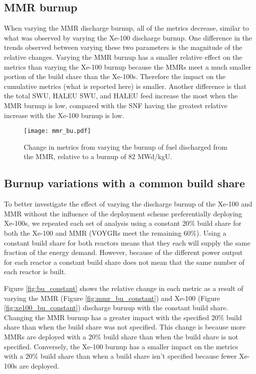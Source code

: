 \subsection{MMR burnup}
When varying the \gls{MMR} discharge burnup, all of the metrics decrease, similar 
to what was observed by varying the Xe-100 discharge burnup. One difference in 
the trends observed between varying these two parameters is the magnitude of 
the relative changes. Varying the \gls{MMR} burnup has a smaller relative effect 
on the metrics than varying the Xe-100 burnup because the \glspl{MMR}
meet a much smaller portion of the build share than the Xe-100s.
Therefore the impact on the cumulative metrics 
(what is reported here) is smaller. Another difference is that the total 
\gls{SWU}, \gls{HALEU} \gls{SWU}, and \gls{HALEU} feed increase the most 
when the \gls{MMR} burnup is low, compared with the \gls{SNF} having the 
greatest relative increase with the Xe-100 burnup is low. 

\begin{figure}[ht]
    \centering
    \texttt{[image: mmr\_bu.pdf]}
    \caption{Change in metrics from varying the burnup of fuel 
    discharged from the MMR, relative to a burnup of 82 MWd/kgU.}
    \label{fig:mmr_bu_s7}
\end{figure}

\subsection{Burnup variations with a common build share}
To better investigate the effect of varying the discharge burnup of the Xe-100 
and \gls{MMR} without the influence of the deployment scheme preferentially
deploying Xe-100s, we repeated each set of analysis using a constant 20\% 
build share for both the Xe-100 and \gls{MMR} (VOYGRs meet the remaining 60\%). 
Using a constant build share for 
both reactors means that they each will supply the same fraction of the energy demand.
However, because of the different power output for each reactor a constant build 
share does not mean that the same number of each reactor is built. 

Figure \ref{fig:bu_constant} shows the relative change in each metric as a result 
of varying the \gls{MMR} (Figure \ref{fig:mmr_bu_constant}) and Xe-100 
(Figure \ref{fig:xe100_bu_constant}) discharge burnup with the constant build 
share. Changing the \gls{MMR} burnup has a greater impact with the specified 20\% 
build share than when the build share was not specified. This change is because 
more \glspl{MMR} are deployed with a 20\% build share than when the build share is 
not specified. Conversely, the Xe-100 burnup has a smaller impact on the metrics 
with a 20\% build share than when a build share isn't specified because fewer 
Xe-100s are deployed. 

